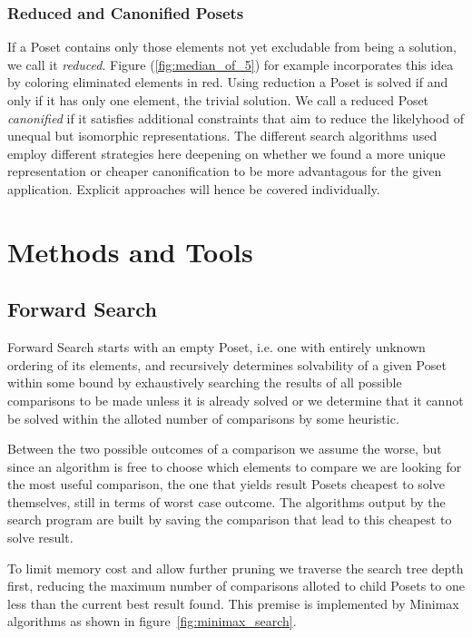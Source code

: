 \documentclass[10pt,journal,compsoc]{IEEEtran}
\begin{document}
\subsubsection{Reduced and Canonified Posets}

If a Poset contains only those elements not yet excludable from being a solution, we call it \textit{reduced}.
Figure (\ref{fig:median_of_5}) for example incorporates this idea by
coloring eliminated elements in red.
Using reduction a Poset is solved if and only if it has only one element, the trivial solution.
We call a reduced Poset \textit{canonified} if it satisfies additional constraints that
aim to reduce the likelyhood of unequal but isomorphic representations.
The different search algorithms used employ different strategies here deepening on whether we
found a more unique representation or cheaper canonification to be more advantagous for
the given application. Explicit approaches will hence be covered individually.


\section{Methods and Tools}
\subsection{Forward Search}\label{chapter:forward_search}
Forward Search starts with an empty Poset, i.e. one with entirely unknown ordering of its elements,
and recursively determines solvability of a given Poset within some bound by exhaustively searching
the results of all possible comparisons to be made unless it is already solved or we determine that
it cannot be solved within the alloted number of comparisons by some heuristic.

Between the two possible outcomes of a comparison we assume the worse, but since an algorithm is
free to choose which elements to compare we are looking for the most useful comparison, the one that
yields result Posets cheapest to solve themselves, still in terms of worst case outcome. The
algorithms output by the search program are built by saving the comparison that lead to this
cheapest to solve result.

To limit memory cost and allow further pruning we traverse the search tree depth first, reducing the
maximum number of comparisons alloted to child Posets to one less than the current best result
found. This premise is implemented by Minimax algorithms as shown in
figure~\ref{fig:minimax_search}.
\end{document}
